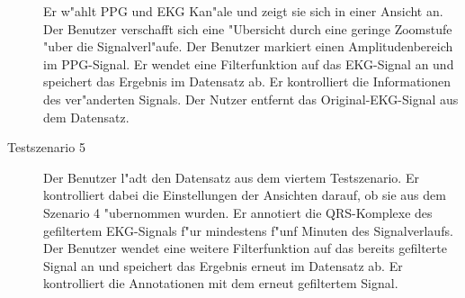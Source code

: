 \begin{description}
					  Er w"ahlt \ac{PPG} und \ac{EKG} Kan"ale und zeigt sie sich in einer Ansicht an.
					  Der Benutzer verschafft sich eine "Ubersicht durch eine geringe Zoomstufe "uber die Signalverl"aufe.
					  Der Benutzer markiert einen Amplitudenbereich im \ac{PPG}-Signal.
					  Er wendet eine Filterfunktion auf das \ac{EKG}-Signal an und speichert das Ergebnis im Datensatz ab.
					  Er kontrolliert die Informationen des ver"anderten Signals.
					  Der Nutzer entfernt das Original-\ac{EKG}-Signal aus dem Datensatz.
\item[Testszenario 5] Der Benutzer l"adt den Datensatz aus dem viertem Testszenario.
					  Er kontrolliert dabei die Einstellungen der Ansichten darauf, ob sie aus dem Szenario 4 "ubernommen wurden.
					  Er annotiert die QRS-Komplexe des gefiltertem \ac{EKG}-Signals f"ur mindestens f"unf Minuten des Signalverlaufs.
					  Der Benutzer wendet eine weitere Filterfunktion auf das bereits gefilterte Signal an und speichert das Ergebnis erneut im Datensatz ab.
					  Er kontrolliert die Annotationen mit dem erneut gefiltertem Signal.
\end{description}

